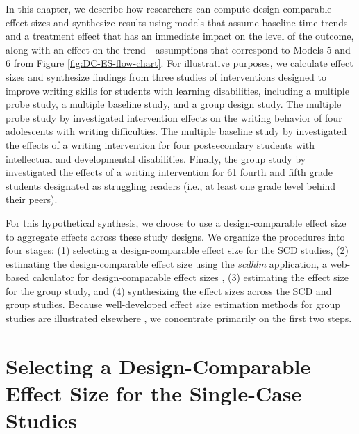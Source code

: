 \documentclass[
]{book}
\begin{document}
In this chapter, we describe how researchers can compute design-comparable effect sizes and synthesize results using models that assume baseline time trends and a treatment effect that has an immediate impact on the level of the outcome, along with an effect on the trend---assumptions that correspond to Models 5 and 6 from Figure \ref{fig:DC-ES-flow-chart}. For illustrative purposes, we calculate effect sizes and synthesize findings from three studies of interventions designed to improve writing skills for students with learning disabilities, including a multiple probe study, a multiple baseline study, and a group design study. The multiple probe study by \citet{datchuk2016Writing} investigated intervention effects on the writing behavior of four adolescents with writing difficulties. The multiple baseline study by \citet{rodgers2021Effects} investigated the effects of a writing intervention for four postsecondary students with intellectual and developmental disabilities. Finally, the group study by \citet{hebert2018Writing} investigated the effects of a writing intervention for 61 fourth and fifth grade students designated as struggling readers (i.e., at least one grade level behind their peers).

For this hypothetical synthesis, we choose to use a design-comparable effect size to aggregate effects across these study designs. We organize the procedures into four stages: (1) selecting a design-comparable effect size for the SCD studies, (2) estimating the design-comparable effect size using the \emph{scdhlm} application, a web-based calculator for design-comparable effect sizes \citep{pustejovsky2021scdhlm}, (3) estimating the effect size for the group study, and (4) synthesizing the effect sizes across the SCD and group studies. Because well-developed effect size estimation methods for group studies are illustrated elsewhere \citep{borenstein2021introduction, cooper2019handbook}, we concentrate primarily on the first two steps.

\hypertarget{selecting-a-design-comparable-effect-size-for-the-single-case-studies-2}{%
\section{Selecting a Design-Comparable Effect Size for the Single-Case Studies}\label{selecting-a-design-comparable-effect-size-for-the-single-case-studies-2}}
\end{document}
